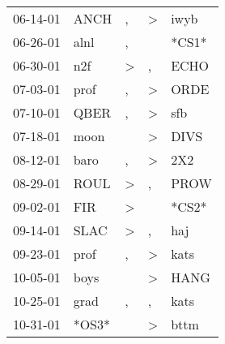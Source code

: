 \begin{supertabular}{p{0.07\textwidth}p{0.06\textwidth}p{0.02\textwidth}p{0.02\textwidth}p{0.06\textwidth}}
          06-14-01\textsuperscript{} &           ANCH\textsuperscript{} &                , &     \textgreater &           iwyb\textsuperscript{} \\
          06-26-01\textsuperscript{} &           alnl\textsuperscript{} &                , &                  &                            *CS1* \\
          06-30-01\textsuperscript{} &            n2f\textsuperscript{} &     \textgreater &                , &           ECHO\textsuperscript{} \\
          07-03-01\textsuperscript{} &           prof\textsuperscript{} &                , &     \textgreater &           ORDE\textsuperscript{} \\
          07-10-01\textsuperscript{} &           QBER\textsuperscript{} &                , &     \textgreater &            sfb\textsuperscript{} \\
          07-18-01\textsuperscript{} &           moon\textsuperscript{} &                  &     \textgreater &           DIVS\textsuperscript{} \\
          08-12-01\textsuperscript{} &           baro\textsuperscript{} &                , &     \textgreater &            2X2\textsuperscript{} \\
          08-29-01\textsuperscript{} &           ROUL\textsuperscript{} &     \textgreater &                , &           PROW\textsuperscript{} \\
          09-02-01\textsuperscript{} &            FIR\textsuperscript{} &     \textgreater &                  &                            *CS2* \\
          09-14-01\textsuperscript{} &           SLAC\textsuperscript{} &     \textgreater &                , &            haj\textsuperscript{} \\
          09-23-01\textsuperscript{} &           prof\textsuperscript{} &                , &     \textgreater &           kats\textsuperscript{} \\
          10-05-01\textsuperscript{} &           boys\textsuperscript{} &                  &     \textgreater &           HANG\textsuperscript{} \\
          10-25-01\textsuperscript{} &           grad\textsuperscript{} &                , &                , &           kats\textsuperscript{} \\
          10-31-01\textsuperscript{} &                            *OS3* &                  &     \textgreater &           bttm\textsuperscript{} \\

\end{supertabular}
